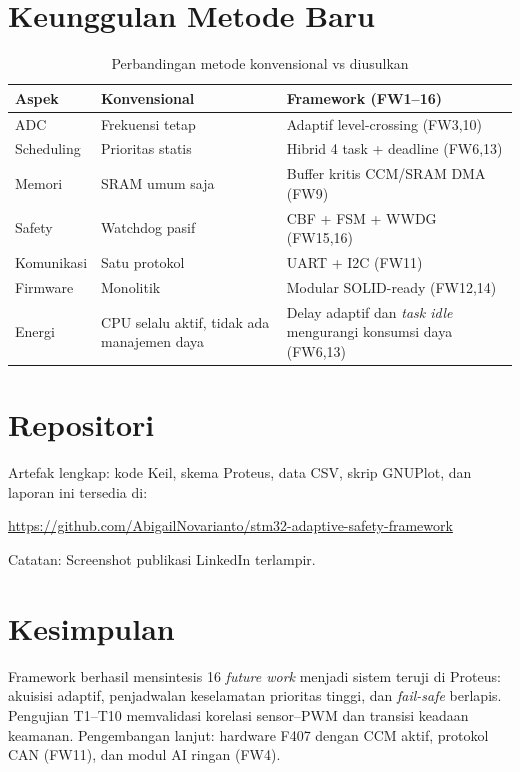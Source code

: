 \documentclass[12pt,a4paper]{article}
\begin{document}
\section{Keunggulan Metode Baru}
\begin{table}[H]
\centering
\caption{Perbandingan metode konvensional vs diusulkan}\label{tab:keunggulan}
\small
\begin{tabular}{lp{5.5cm}p{5.5cm}}
\toprule
\textbf{Aspek} & \textbf{Konvensional} & \textbf{Framework (FW1--16)} \\
\midrule
ADC & Frekuensi tetap & Adaptif level-crossing (FW3,10) \\
Scheduling & Prioritas statis & Hibrid 4 task + deadline (FW6,13) \\
Memori & SRAM umum saja & Buffer kritis CCM/SRAM DMA (FW9) \\
Safety & Watchdog pasif & CBF + FSM + WWDG (FW15,16) \\
Komunikasi & Satu protokol & UART + I2C (FW11) \\
Firmware & Monolitik & Modular SOLID-ready (FW12,14) \\
Energi & CPU selalu aktif, tidak ada manajemen daya & Delay adaptif dan \textit{task idle} mengurangi konsumsi daya (FW6,13) \\
\bottomrule
\end{tabular}
\end{table}

\section{Repositori}
Artefak lengkap: kode Keil, skema Proteus, data CSV, skrip GNUPlot, dan laporan ini tersedia di:
\begin{center}
\url{https://github.com/AbigailNovarianto/stm32-adaptive-safety-framework}
\end{center}
Catatan: Screenshot publikasi LinkedIn terlampir.

\section{Kesimpulan}
Framework berhasil mensintesis 16 \textit{future work} menjadi sistem teruji di Proteus: akuisisi adaptif, penjadwalan keselamatan prioritas tinggi, dan \textit{fail-safe} berlapis. Pengujian T1--T10 memvalidasi korelasi sensor--PWM dan transisi keadaan keamanan. Pengembangan lanjut: hardware F407 dengan CCM aktif, protokol CAN (FW11), dan modul AI ringan (FW4).
\end{document}
